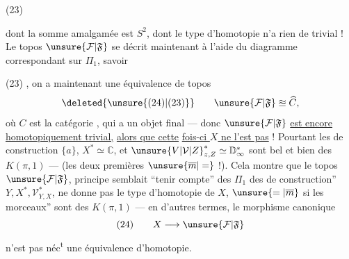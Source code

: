 \noindent (23)

dont la somme amalgamée est $S^2$, dont
le type d'homotopie n'a rien de trivial !
Le topos $\unsure{\mathcal F|\mathfrak F}$ se décrit maintenant à
l'aide du diagramme correspondant sur  $\Pi_1$,
savoir

\noindent (23)
,
on a maintenant une équivalence de topos
\[
\deleted{\unsure{(24)|(23)}}\qquad \unsure{\mathcal F|\mathfrak F}\approxeq\widehat C,
\]
où $C$ est la catégorie \diagram{\begin{tikzcd}[column sep=small]\bullet\arrow[r]&\bullet\end{tikzcd}}, qui a
un objet final --- donc $\unsure{\mathcal F|\mathfrak F}$ \uline{est encore}
\uline{homotopiquement trivial,} \uline{alors que cette}
\uline{fois-ci $X$ ne l'est pas} ! Pourtant les
 de construction $\{a\}$, $X^*\simeq\mathbb C$, et
${\unsure{V|\mathcal V|Z}}^*_{z,Z}\simeq\mathbb D^*_{\infty}$ sont bel et bien des $K(\pi,1)$ ---
(les deux premières $\unsure{\overline m|=}$  !). Cela
montre que le topos $\unsure{\mathcal F|\mathfrak F}$, 
principe semblait ``tenir compte'' des
$\Pi_1$ des  de construction'' $Y,X^*,\mathcal V^*_{Y,X}$,
ne donne pas  le type d'homotopie
de $X$, $\unsure{=|\overline m}$ si les morceaux'' sont des
$K(\pi,1)$ --- en d'autres termes, le
morphisme canonique
\[
(24)\qquad X\longrightarrow\unsure{\mathcal F|\mathfrak F}
\]
n'est pas néc\textsuperscript{t} une équivalence d'homotopie.

